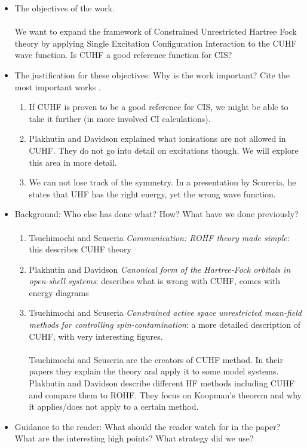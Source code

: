 \documentclass[twoside,twocolumn,9pt]{article}
\begin{document}
\begin{itemize}
    \item The objectives of the work. 
    \paragraph*{}
    We want to expand the framework of Constrained Unrestricted Hartree Fock theory by applying Single Excitation Configuration 
    Interaction to the CUHF wave function. Is CUHF a good reference function for CIS? 
    \item The justification for these objectives: Why is the work important? Cite the most important works \cite{whitesides2004a}.
    \begin{enumerate}
      \item If CUHF is proven to be a good reference for CIS, we might be able to take it further (in more involved CI calculations).
      \item Plakhutin and Davidson explained what ionisations are not allowed in CUHF. They do not go into detail on excitations though. We will explore this area in more detail.
      \item We can not lose track of the symmetry. In a presentation by Scureria, he states that UHF has the right energy, yet the wrong wave function.
    \end{enumerate}
    \item Background: Who else has done what? How? What have we done previously?
    \paragraph*{}
    \begin{enumerate}
      \item Tsuchimochi and Scuseria \textit{Communication: ROHF theory made simple}: this describes CUHF theory
      \item Plakhutin and Davidson \textit{Canonical form of the Hartree-Fock orbitals in open-shell systems}: describes what is wrong with CUHF, comes with energy diagrams
      \item Tsuchimochi and Scuseria \textit{Constrained active space unrestricted mean-field methods for controlling spin-contamination}: a more detailed description of CUHF, with very interesting figures.
      \paragraph*{}
      Tsuchimochi and Scuseria are the creators of CUHF method. In their papers they explain the theory and apply it to some model systems. Plakhutin and Davidson describe different HF methods including CUHF and compare them to ROHF. They focus on Koopman's theorem and why it applies/does not apply to a certain method.
    \end{enumerate}
    \item Guidance to the reader: What should the reader watch for in the paper? What are the interesting high points? What strategy did we use?

\end{itemize}
\end{document}
